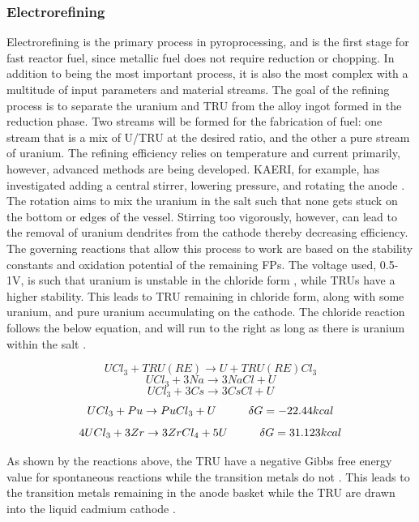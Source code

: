\subsubsection{Electrorefining}
Electrorefining is the primary process in pyroprocessing, and is the first stage for fast reactor fuel, since metallic fuel does not require reduction or chopping.
In addition to being the most important process, it is also the most complex with a multitude of input parameters and material streams. 
The goal of the refining process is to separate the uranium and TRU from the alloy ingot formed in the reduction phase.
Two streams will be formed for the fabrication of fuel: one stream that is a mix of U/TRU at the desired ratio, and the other a pure stream of uranium.
The refining efficiency relies on temperature and current primarily, however, advanced methods are being developed.
KAERI, for example, has investigated adding a central stirrer, lowering pressure, and rotating the anode \cite{lee_advanced}.
The rotation aims to mix the uranium in the salt such that none gets stuck on the bottom or edges of the vessel. 
Stirring too vigorously, however, can lead to the removal of uranium dendrites from the cathode thereby decreasing efficiency.\\

The governing reactions that allow this process to work are based on the stability constants and oxidation potential of the remaining FPs.
The voltage used,  0.5-1V, is such that uranium is unstable in the chloride form \cite{organisation}, while TRUs have a higher stability. 
This leads to TRU remaining in chloride form, along with some uranium, and pure uranium accumulating on the cathode.
The chloride reaction follows the below equation, and will run to the right as long as there is uranium within the salt \cite{organisation}.

\[ UCl_3+TRU(RE) \rightarrow U + TRU(RE)Cl_3 \]
\[ UCl_3 + 3Na \rightarrow 3NaCl + U \]
\[ UCl_3 + 3Cs \rightarrow 3CsCl + U \]
\[ UCl_3 + Pu \rightarrow PuCl_3 + U \hspace{10mm} \delta G = -22.44kcal \]
\[ 4UCl_3 + 3Zr \rightarrow 3ZrCl_4 + 5U \hspace{10mm} \delta G = 31.123kcal \]

As shown by the reactions above, the TRU have a negative Gibbs free energy value for spontaneous reactions while the transition metals do not \cite{supy}.
This leads to the transition metals remaining in the anode basket while the TRU are drawn into the liquid cadmium cathode \cite{lee_korean_2011}.


